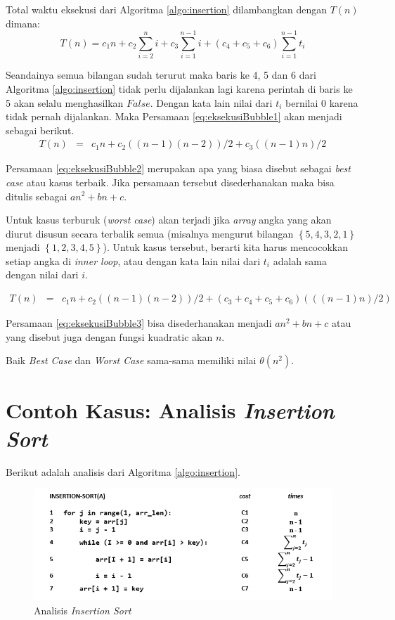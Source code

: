 Total waktu eksekusi dari Algoritma \ref{algo:insertion} dilambangkan dengan $T(n)$ dimana:
\begin{equation}
\label{eq:eksekusiBubble1}
T(n) = c_{1}n + c_{2}\sum\limits_{i=2}^n i + c_{3}\sum\limits_{i=1}^{n-1} i + (c_{4}+c_{5}+c_{6})\sum\limits_{i=1}^{n-1} t_{i} 
\end{equation} 

Seandainya semua bilangan sudah terurut maka baris ke 4, 5 dan 6 dari Algoritma \ref{algo:insertion} tidak perlu dijalankan lagi karena perintah di baris ke 5 akan selalu menghasilkan $False$. Dengan kata lain nilai dari $t_{i}$ bernilai 0 karena tidak pernah dijalankan. Maka Persamaan \ref{eq:eksekusiBubble1} akan menjadi sebagai berikut.
\begin{eqnarray}
T(n) & = & c_{1}n + c_2((n-1)(n-2))/2+c_3((n-1)n)/2
\label{eq:eksekusiBubble2}
\end{eqnarray}

Persamaan \ref{eq:eksekusiBubble2} merupakan apa yang biasa disebut sebagai \textit{best case} atau kasus terbaik. Jika persamaan tersebut disederhanakan maka bisa ditulis sebagai $an^2+bn+c$. 

Untuk kasus terburuk (\textit{worst case}) akan terjadi jika \textit{array} angka yang akan diurut disusun secara terbalik semua (misalnya mengurut bilangan $\left\{5,4,3,2,1\right\}$ menjadi $\left\{1,2,3,4,5\right\}$). Untuk kasus tersebut, berarti kita harus mencocokkan setiap angka di \textit{inner loop}, atau dengan kata lain nilai dari $t_{i}$ adalah sama dengan nilai dari $i$. 

\begin{eqnarray}
T(n) & = & c_{1}n + c_2((n-1)(n-2))/2+(c_3+c_4+c_5+c_6)(((n-1)n)/2)
\label{eq:eksekusiBubble3}
\end{eqnarray}

Persamaan \ref{eq:eksekusiBubble3} bisa disederhanakan menjadi $an^2+bn+c$ atau yang disebut juga dengan fungsi kuadratic akan $n$. 

Baik \textit{Best Case} dan \textit{Worst Case} sama-sama memiliki nilai $\theta(n^2)$.

\section{Contoh Kasus: Analisis \textit{Insertion Sort}}
Berikut adalah analisis dari Algoritma \ref{algo:insertion}.
\begin{figure}[htbp]%
	\includegraphics[scale=0.7]{fig/InsertionSortAnalysis}%
	\caption{Analisis \textit{Insertion Sort}}%
	\label{fig:analisisInsertionSort}%
\end{figure}

